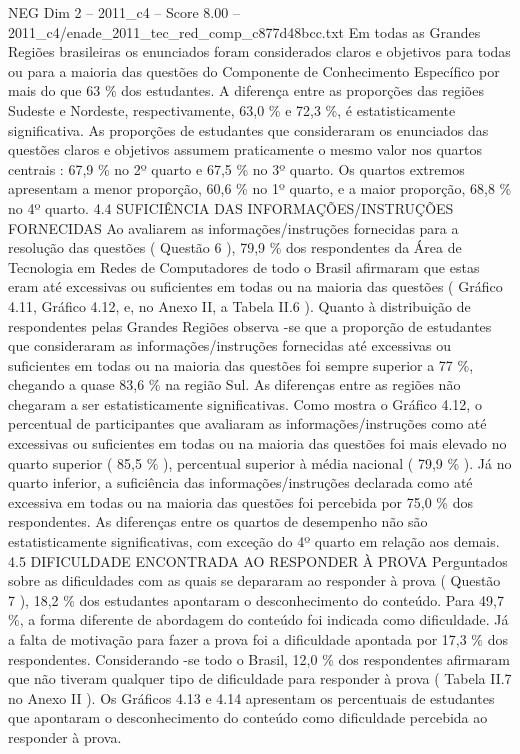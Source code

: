 \begin{textsample}{NEG Dim 2 – 2011\_c4 – Score 8.00 – 2011\_c4/enade\_2011\_tec\_red\_comp\_c877d48bcc.txt}
Em todas as Grandes Regiões brasileiras os enunciados foram considerados claros e objetivos para todas ou para a maioria das questões do Componente de Conhecimento Específico por mais do que 63 \% dos estudantes.
A diferença entre as proporções das regiões Sudeste e Nordeste, respectivamente, 63,0 \% e 72,3 \%, é estatisticamente significativa.
As proporções de estudantes que consideraram os enunciados das questões claros e objetivos assumem praticamente o mesmo valor nos quartos centrais : 67,9 \% no 2º quarto e 67,5 \% no 3º quarto.
Os quartos extremos apresentam a menor proporção, 60,6 \% no 1º quarto, e a maior proporção, 68,8 \% no 4º quarto. 4.4 SUFICIÊNCIA DAS INFORMAÇÕES/INSTRUÇÕES FORNECIDAS Ao avaliarem as informações/instruções fornecidas para a resolução das questões ( Questão 6 ), 79,9 \% dos respondentes da Área de Tecnologia em Redes de Computadores de todo o Brasil afirmaram que estas eram até excessivas ou suficientes em todas ou na maioria das questões ( Gráfico 4.11, Gráfico 4.12, e, no Anexo II, a Tabela II.6 ).
Quanto à distribuição de respondentes pelas Grandes Regiões observa -se que a proporção de estudantes que consideraram as informações/instruções fornecidas até excessivas ou suficientes em todas ou na maioria das questões foi sempre superior a 77 \%, chegando a quase 83,6 \% na região Sul.
As diferenças entre as regiões não chegaram a ser estatisticamente significativas.
Como mostra o Gráfico 4.12, o percentual de participantes que avaliaram as informações/instruções como até excessivas ou suficientes em todas ou na maioria das questões foi mais elevado no quarto superior ( 85,5 \% ), percentual superior à média nacional ( 79,9 \% ).
Já no quarto inferior, a suficiência das informações/instruções declarada como até excessiva em todas ou na maioria das questões foi percebida por 75,0 \% dos respondentes.
As diferenças entre os quartos de desempenho não são estatisticamente significativas, com exceção do 4º quarto em relação aos demais. 4.5 DIFICULDADE ENCONTRADA AO RESPONDER À PROVA Perguntados sobre as dificuldades com as quais se depararam ao responder à prova ( Questão 7 ), 18,2 \% dos estudantes apontaram o desconhecimento do conteúdo.
Para 49,7 \%, a forma diferente de abordagem do conteúdo foi indicada como dificuldade.
Já a falta de motivação para fazer a prova foi a dificuldade apontada por 17,3 \% dos respondentes.
Considerando -se todo o Brasil, 12,0 \% dos respondentes afirmaram que não tiveram qualquer tipo de dificuldade para responder à prova ( Tabela II.7 no Anexo II ).
Os Gráficos 4.13 e 4.14 apresentam os percentuais de estudantes que apontaram o desconhecimento do conteúdo como dificuldade percebida ao responder à prova.

\end{textsample}

